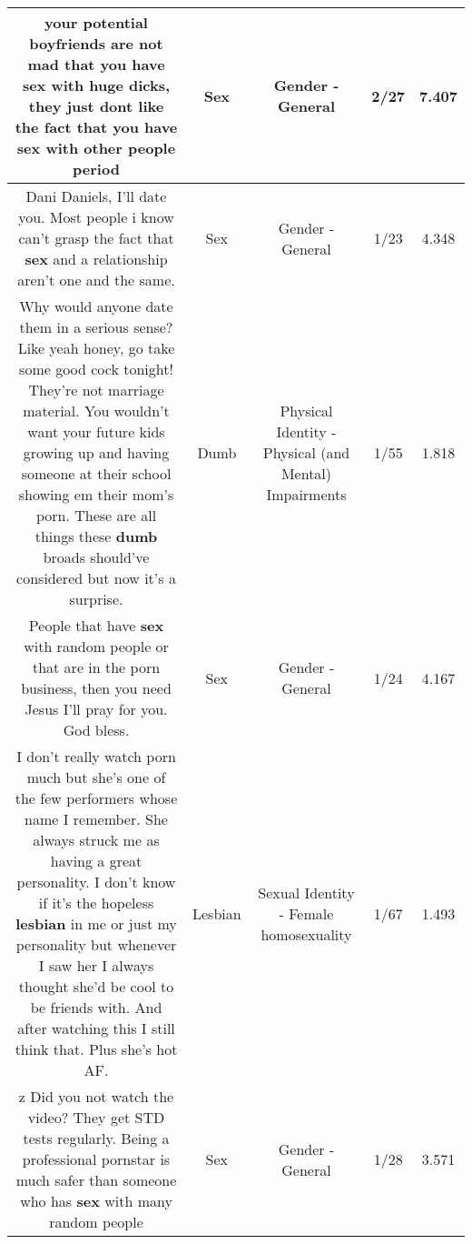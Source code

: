 \documentclass[11pt]{article}
\newlength\mylength
\begin{document}
\begin{center}
\begin{longtable}{|C{.65\mylength}|C{.30\mylength}|C{.12\mylength}|C{.12\mylength}|C{.12\mylength}|}
  \small your potential boyfriends are not mad that you have \textbf{sex} with huge dicks,  they just dont like the fact that you have \textbf{sex} with other people period\normalsize   & Sex & Gender - General & 2/27 & 7.407 \\  \hline
  \small Dani Daniels, I'll date you. Most people i know can't grasp the fact that \textbf{sex} and a relationship aren't one and the same.\normalsize   & Sex & Gender - General & 1/23 & 4.348 \\  \hline
  \small Why would anyone date them in a serious sense? Like yeah honey, go take some good cock tonight! They're not marriage material. You wouldn't want your future kids growing up and having someone at their school showing em their mom's porn. These are all things these \textbf{dumb} broads should've considered but now it's a surprise.\normalsize   & Dumb & Physical Identity - Physical (and Mental) Impairments & 1/55 & 1.818 \\  \hline
  \small People that have \textbf{sex} with random people or that are in the porn business, then you need Jesus I'll pray for you. God bless.\normalsize   & Sex & Gender - General & 1/24 & 4.167 \\  \hline
  \small I don't really watch porn much but she's one of the few performers whose name I remember. She always struck me as having a great personality. I don't know if it's the hopeless \textbf{lesbian} in me or just my personality but whenever I saw her I always thought she'd be cool to be friends with. And after watching this I still think that. Plus she's hot AF.\normalsize   & Lesbian & Sexual Identity - Female homosexuality & 1/67 & 1.493 \\  \hline
  \small z Did you not watch the video? They get STD tests regularly. Being a professional pornstar is much safer than someone who has \textbf{sex} with many random people\normalsize   & Sex & Gender - General & 1/28 & 3.571 \\  \hline

\end{longtable}
\end{center}
\end{document}
